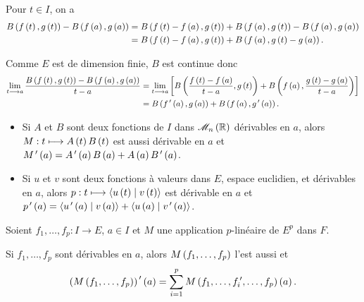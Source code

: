 \begin{dem}
Pour \(t\in I\), on a \[\begin{aligned}
B\left(f\left(t\right),g\left(t\right)\right)-B\left(f\left(a\right),g\left(a\right)\right)&=B\left(f\left(t\right)-f\left(a\right),g\left(t\right)\right)+B\left(f\left(a\right),g\left(t\right)\right)-B\left(f\left(a\right),g\left(a\right)\right) \\
&=B\left(f\left(t\right)-f\left(a\right),g\left(t\right)\right)+B\left(f\left(a\right),g\left(t\right)-g\left(a\right)\right).
\end{aligned}\]

Comme \(E\) est de dimension finie, \(B\) est continue donc \[\begin{aligned}
\lim_{t\longrightarrow a}\dfrac{B\left(f\left(t\right),g\left(t\right)\right)-B\left(f\left(a\right),g\left(a\right)\right)}{t-a}&=\lim_{t\longrightarrow a}\left[B\left(\dfrac{f\left(t\right)-f\left(a\right)}{t-a},g\left(t\right)\right)+B\left(f\left(a\right),\dfrac{g\left(t\right)-g\left(a\right)}{t-a}\right)\right] \\
&=B\left(f^{\,\prime}\left(a\right),g\left(a\right)\right)+B\left(f\left(a\right),g^{\,\prime}\left(a\right)\right).
\end{aligned}\]
\end{dem}

\begin{ex}
\begin{itemize}
    \item Si \(A\) et \(B\) sont deux fonctions de \(I\) dans \(\M{n}[\R]\) dérivables en \(a\), alors \(M:t\longmapsto A\left(t\right)B\left(t\right)\) est aussi dérivable en \(a\) et \(M^{\,\prime}\left(a\right)=A^{\,\prime}\left(a\right)B\left(a\right)+A\left(a\right)B^{\,\prime}\left(a\right)\). \\
    \item Si \(u\) et \(v\) sont deux fonctions à valeurs dans \(E\), espace euclidien, et dérivables en \(a\), alors \(p:t\mapsto\ps{u\paren{t}}{v\paren{t}}\) est dérivable en \(a\) et \(p\prim\paren{a}=\ps{u\prim\paren{a}}{v\paren{a}}+\ps{u\paren{a}}{v\prim\paren{a}}\).
\end{itemize}
\end{ex}

\begin{prop}
Soient \(f_1,\dots,f_p:I\to E\), \(a\in I\) et \(M\) une application \(p\)-linéaire de \(E^p\) dans \(F\).

Si \(f_1,\dots,f_p\) sont dérivables en \(a\), alors \(M\left(f_1,\dots,f_p\right)\) l'est aussi et \[\left(M\left(f_1,\dots,f_p\right)\right)^{\,\prime}\left(a\right)=\sum_{i=1}^pM\left(f_1,\dots,f_i^{\,\prime},\dots,f_p\right)\left(a\right).\]
\end{prop}

